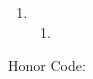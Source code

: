 \documentclass[11pt]{article}
\begin{document}
\begin{enumerate}
    \hrulefill

    \item\begin{enumerate}[label=(\roman*)]
        \item 
    \end{enumerate}

    \hrulefill
\end{enumerate}
Honor Code: \vspace*{7em}
\end{document}
